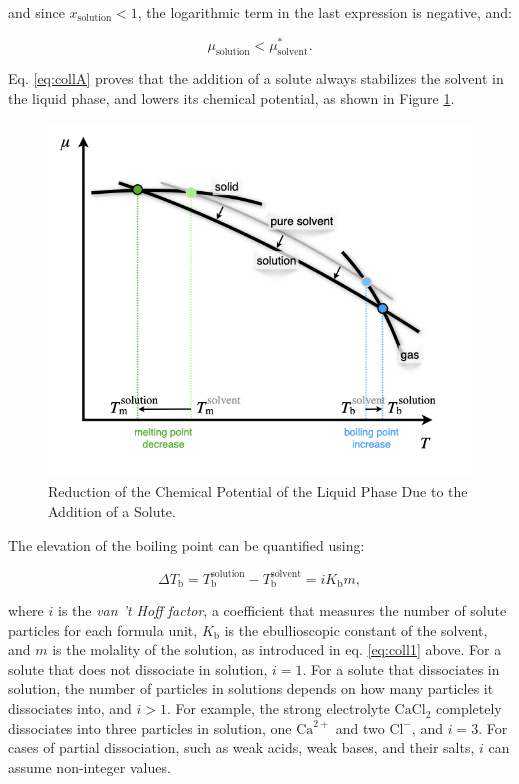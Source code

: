\documentclass[
  9pt,
]{extbook}
\theoremstyle{definition}
\theoremstyle{definition}
\theoremstyle{definition}
\theoremstyle{definition}
\theoremstyle{remark}
\begin{document}
and since \(x_{\text{solution}}<1\), the logarithmic term in the last expression is negative, and:

\begin{equation}
\mu_{\text{solution}} < \mu_{\text{solvent}}^*. 
\label{eq:collB}
\end{equation}

Eq. \eqref{eq:collA} proves that the addition of a solute always stabilizes the solvent in the liquid phase, and lowers its chemical potential, as shown in Figure \ref{fig:FigSol2}.

\begin{figure}

{\centering \includegraphics[width=0.6\linewidth]{./img/OEP_Figures.034} 

}

\caption{Reduction of the Chemical Potential of the Liquid Phase Due to the Addition of a Solute.}\label{fig:FigSol2}
\end{figure}

The elevation of the boiling point can be quantified using:

\begin{equation}
\Delta T_{\text{b}}=T_{\text{b}}^{\text{solution}}-T_{\text{b}}^{\text{solvent}}=iK_{\text{b}}m,
\label{eq:coll3}
\end{equation}

where \(i\) is the \emph{van 't Hoff factor}, a coefficient that measures the number of solute particles for each formula unit, \(K_{\text{b}}\) is the ebullioscopic constant of the solvent, and \(m\) is the molality of the solution, as introduced in eq. \eqref{eq:coll1} above. For a solute that does not dissociate in solution, \(i=1\). For a solute that dissociates in solution, the number of particles in solutions depends on how many particles it dissociates into, and \(i>1\). For example, the strong electrolyte \(\mathrm{Ca}\mathrm{Cl}_2\) completely dissociates into three particles in solution, one \(\mathrm{Ca}^{2+}\) and two \(\mathrm{Cl}^-\), and \(i=3\). For cases of partial dissociation, such as weak acids, weak bases, and their salts, \(i\) can assume non-integer values.
\end{document}
